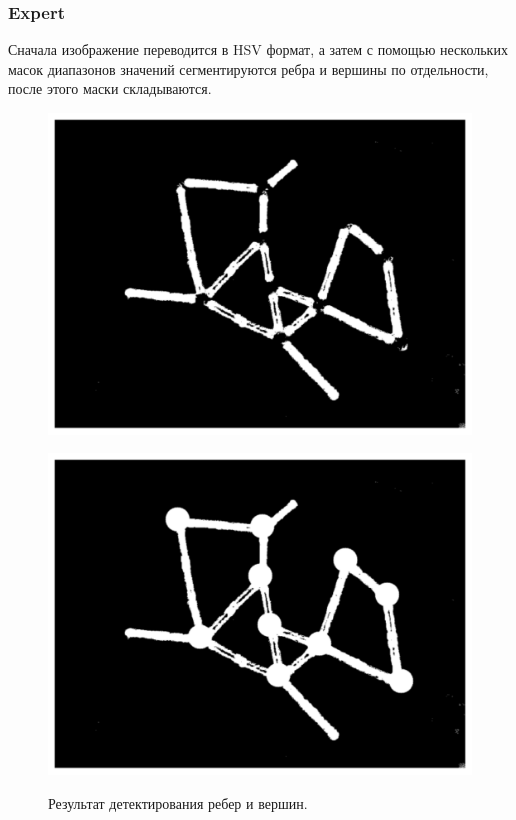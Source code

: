 \documentclass[10pt]{article}
\begin{document}
	
	
	\subsubsection*{Expert}
	
	Сначала изображение переводится в HSV формат, а затем с помощью нескольких масок диапазонов значений сегментируются ребра и вершины по отдельности, после этого маски складываются.
	
	\begin{figure}[h]
		\begin{minipage}[h]{0.3\linewidth}
			\begin{center}
				{\includegraphics[width=1.0\linewidth]{data/expert_green.pdf}}
			\end{center}
		\end{minipage}
		\hfill
		\begin{minipage}[h]{0.3\linewidth}
			\begin{center}
				{\includegraphics[width=1.0\linewidth]{data/expert_with_circles.pdf}}
			\end{center}
		\end{minipage}
		
		\caption{Результат детектирования ребер и вершин.}
		\label{ris:image6}
	\end{figure}
	
\end{document}
